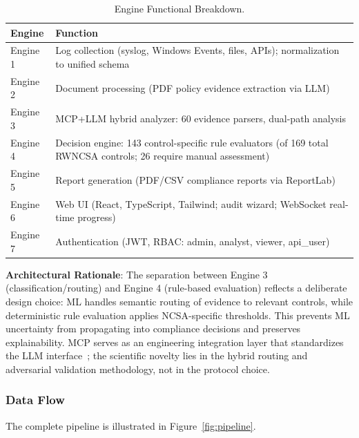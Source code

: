 \documentclass[futureinternet,article,submit,pdftex,moreauthors]{Definitions/mdpi}
\begin{document}
\begin{table}[H]
\caption{Engine Functional Breakdown.\label{tab:engines}}
\begin{tabularx}{\textwidth}{lX}
\toprule
\textbf{Engine} & \textbf{Function} \\
\midrule
Engine 1 & Log collection (syslog, Windows Events, files, APIs); normalization to unified schema \\
Engine 2 & Document processing (PDF policy evidence extraction via LLM) \\
Engine 3 & MCP+LLM hybrid analyzer: 60 evidence parsers, dual-path analysis \\
Engine 4 & Decision engine: 143 control-specific rule evaluators (of 169 total RWNCSA controls; 26 require manual assessment) \\
Engine 5 & Report generation (PDF/CSV compliance reports via ReportLab) \\
Engine 6 & Web UI (React, TypeScript, Tailwind; audit wizard; WebSocket real-time progress) \\
Engine 7 & Authentication (JWT, RBAC: admin, analyst, viewer, api\_user) \\
\bottomrule
\end{tabularx}
\end{table}

\textbf{Architectural Rationale}: The separation between Engine 3 (classification/routing) and
Engine 4 (rule-based evaluation) reflects a deliberate design choice: ML handles semantic
routing of evidence to relevant controls, while deterministic rule evaluation applies
NCSA-specific thresholds. This prevents ML uncertainty from propagating into compliance
decisions and preserves explainability. MCP serves as an engineering integration layer
that standardizes the LLM interface~\cite{mcp_enterprise,mcp_landscape}; the scientific novelty lies
in the hybrid routing and adversarial validation methodology, not in the protocol choice.

\subsubsection{Data Flow}

The complete pipeline is illustrated in Figure~\ref{fig:pipeline}.
\end{document}
